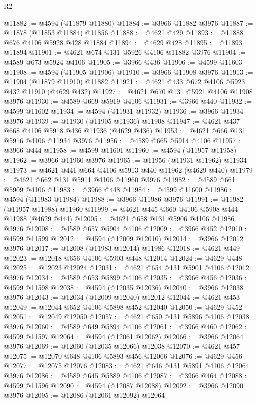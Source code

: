 \begin{lexlean}{R2}
\begin{coremodule}
@11882 := @4594 (@11879 @11880)
@11884 := @3966 @11882 @3976
@11887 := @11878 (@11853 @11884) @11856
@11888 := @4621 @429
@11893 := @11888 @676 @4106 @5928 @428 @11884
@11894 := @4629 @428
@11895 := @11893 @11894
@11901 := @4621 @674 @131 @5926 @4106 @11882 @3976
@11904 := @4589 @673 @5924 @4106
@11905 := @3966 @436
@11906 := @4599 @11603
@11908 := @4594 (@11905 @11906)
@11910 := @3966 @11908 @3976
@11913 := @11904 (@11879 @11910) @11882
@11921 := @4621 @433 @672 @4106 @5923 @432 @11910 (@4629 @432)
@11927 := @4621 @670 @131 @5921 @4106 @11908 @3976
@11930 := @4589 @669 @5919 @4106
@11931 := @3966 @440
@11932 := @4599 @11602
@11934 := @4594 (@11931 @11932)
@11936 := @3966 @11934 @3976
@11939 := @11930 (@11905 @11936) @11908
@11947 := @4621 @437 @668 @4106 @5918 @436 @11936 (@4629 @436)
@11953 := @4621 @666 @131 @5916 @4106 @11934 @3976
@11956 := @4589 @665 @5914 @4106
@11957 := @3966 @444
@11958 := @4599 @11601
@11960 := @4594 (@11957 @11958)
@11962 := @3966 @11960 @3976
@11965 := @11956 (@11931 @11962) @11934
@11973 := @4621 @441 @664 @4106 @5913 @440 @11962 (@4629 @440)
@11979 := @4621 @662 @131 @5911 @4106 @11960 @3976
@11982 := @4589 @661 @5909 @4106
@11983 := @3966 @448
@11984 := @4599 @11600
@11986 := @4594 (@11983 @11984)
@11988 := @3966 @11986 @3976
@11991 := @11982 (@11957 @11988) @11960
@11999 := @4621 @445 @660 @4106 @5908 @444 @11988 (@4629 @444)
@12005 := @4621 @658 @131 @5906 @4106 @11986 @3976
@12008 := @4589 @657 @5904 @4106
@12009 := @3966 @452
@12010 := @4599 @11599
@12012 := @4594 (@12009 @12010)
@12014 := @3966 @12012 @3976
@12017 := @12008 (@11983 @12014) @11986
@12018 := @4621 @449
@12023 := @12018 @656 @4106 @5903 @448 @12014
@12024 := @4629 @448
@12025 := @12023 @12024
@12031 := @4621 @654 @131 @5901 @4106 @12012 @3976
@12034 := @4589 @653 @5899 @4106
@12035 := @3966 @456
@12036 := @4599 @11598
@12038 := @4594 (@12035 @12036)
@12040 := @3966 @12038 @3976
@12043 := @12034 (@12009 @12040) @12012
@12044 := @4621 @453
@12049 := @12044 @652 @4106 @5898 @452 @12040
@12050 := @4629 @452
@12051 := @12049 @12050
@12057 := @4621 @650 @131 @5896 @4106 @12038 @3976
@12060 := @4589 @649 @5894 @4106
@12061 := @3966 @460
@12062 := @4599 @11597
@12064 := @4594 (@12061 @12062)
@12066 := @3966 @12064 @3976
@12069 := @12060 (@12035 @12066) @12038
@12070 := @4621 @457
@12075 := @12070 @648 @4106 @5893 @456 @12066
@12076 := @4629 @456
@12077 := @12075 @12076
@12083 := @4621 @646 @131 @5891 @4106 @12064 @3976
@12086 := @4589 @645 @5889 @4106
@12087 := @3966 @464
@12088 := @4599 @11596
@12090 := @4594 (@12087 @12088)
@12092 := @3966 @12090 @3976
@12095 := @12086 (@12061 @12092) @12064

\end{coremodule}
\end{lexlean}
